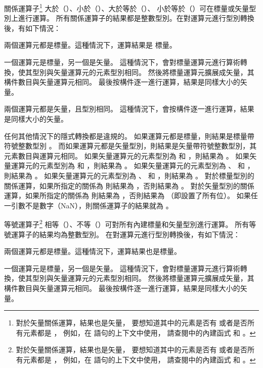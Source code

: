 {%
\startitem
關係運算子\footnote{
對於矢量關係運算，結果也是矢量，
要想知道其中的元素是否有  或者是否所有元素都是 ，
例如，在  語句的上下文中使用，
請查閱中的內建函式  和 。}
大於（\ccmm{>}）、小於（\ccmm{<}）、大於等於（\ccmm{>=}）、
小於等於（\ccmm{<=}）可在標量或矢量型別上進行運算。
所有關係運算子的結果都是整數型別。在對運算元進行型別轉換後，有如下情況：
\startigBase
\item 兩個運算元都是標量。這種情況下，運算結果是  標量。

\item 一個運算元是標量，另一個是矢量。
這種情況下，會對標量運算元進行算術轉換，使其型別與矢量運算元的元素型別相同。
然後將標量運算元擴展成矢量，其構件數目與矢量運算元相同。
最後按構件逐一進行運算，結果是同樣大小的矢量。

\item 兩個運算元都是矢量，且型別相同。
這種情況下，會按構件逐一進行運算，結果是同樣大小的矢量。
\stopigBase

任何其他情況下的隱式轉換都是違規的。
如果運算元都是標量，則結果是標量帶符號整數型別 。
而如果運算元都是矢量型別，則結果是矢量帶符號整數型別，其元素數目與運算元相同。
如果矢量運算元的元素型別為  和 ，則結果為 。
如果矢量運算元的元素型別為  和 ，則結果為 。
如果矢量運算元的元素型別為 、  和 ，則結果為 。
如果矢量運算元的元素型別為 、  和 ，則結果為 。
對於標量型別的關係運算，如果所指定的關係為  則結果為 ，否則結果為 。
對於矢量型別的關係運算，如果所指定的關係為  則結果為 ，否則結果為  （即設置了所有位）。
如果任一引數不是數字（NaN），則關係運算子的結果就為 。
\stopitem

\startitem
等號運算子\footnote{
對於矢量關係運算，結果也是矢量，
要想知道其中的元素是否有  或者是否所有元素都是 ，
例如，在  語句的上下文中使用，
請查閱中的內建函式  和 。}
相等（\ccmm{==}）、不等（\ccmm{!=}）可對所有內建標量和矢量型別進行運算。
所有等號運算子的結果均為整數型別。
在對運算元進行型別轉換後，有如下情況：
\startigBase
\item 兩個運算元都是標量。這種情況下，運算結果也是標量。

\item 一個運算元是標量，另一個是矢量。
這種情況下，會對標量運算元進行算術轉換，使其型別與矢量運算元的元素型別相同。
然後將標量運算元擴展成矢量，其構件數目與矢量運算元相同。
最後按構件逐一進行運算，結果是同樣大小的矢量。

}
